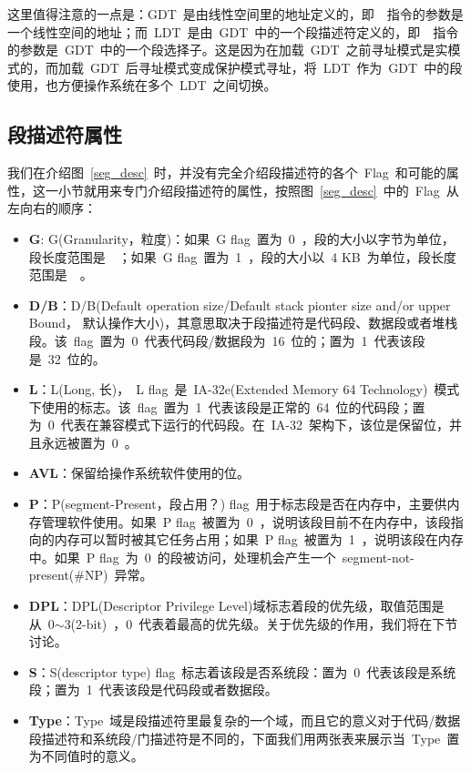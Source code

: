这里值得注意的一点是：GDT~是由线性空间里的地址定义的，即~~指令的参数是一个线性空间的地址；而~LDT~是由~GDT~中的一个段描述符定义的，即~~指令的参数是~GDT~中的一个段选择子。这是因为在加载~GDT~之前寻址模式是实模式的，而加载~GDT~后寻址模式变成保护模式寻址，将~LDT~作为~GDT~中的段使用，也方便操作系统在多个~LDT~之间切换。

\subsection{段描述符属性} \label{CHpm_desattr}

我们在介绍图~\ref{seg_desc}~时，并没有完全介绍段描述符的各个~Flag~和可能的属性，这一小节就用来专门介绍段描述符的属性，按照图~\ref{seg_desc}~中的~Flag~从左向右的顺序：

\begin{itemize}
\item{\textbf{G}}: G(Granularity，粒度)：如果~G flag~置为~0~，段的大小以字节为单位，段长度范围是~~；如果~G flag~置为~1~，段的大小以~4 KB~为单位，段长度范围是~~。
\item{\textbf{D/B}}：D/B(Default operation size/Default stack pionter size and/or upper Bound， 默认操作大小)，其意思取决于段描述符是代码段、数据段或者堆栈段。该~flag~置为~0~代表代码段/数据段为~16~位的；置为~1~代表该段是~32~位的。
\item{\textbf{L}}：L(Long, 长)，~L flag~是~IA-32e(Extended Memory 64 Technology)~模式下使用的标志。该~flag~置为~1~代表该段是正常的~64~位的代码段；置为~0~代表在兼容模式下运行的代码段。在~IA-32~架构下，该位是保留位，并且永远被置为~0~。
\item{\textbf{AVL}}：保留给操作系统软件使用的位。
\item{\textbf{P}}：P(segment-Present，段占用？) flag~用于标志段是否在内存中，主要供内存管理软件使用。如果~P flag~被置为~0~，说明该段目前不在内存中，该段指向的内存可以暂时被其它任务占用；如果~P flag~被置为~1~，说明该段在内存中。如果~P flag~为~0~的段被访问，处理机会产生一个~segment-not-present(\#NP)~异常。
\item{\textbf{DPL}}：DPL(Descriptor Privilege Level)域标志着段的优先级，取值范围是从~0$\sim$3(2-bit)~，0~代表着最高的优先级。关于优先级的作用，我们将在下节讨论。
\item{\textbf{S}}：S(descriptor type) flag~标志着该段是否系统段：置为~0~代表该段是系统段；置为~1~代表该段是代码段或者数据段。
\item{\textbf{Type}}：Type~域是段描述符里最复杂的一个域，而且它的意义对于代码/数据段描述符和系统段/门描述符是不同的，下面我们用两张表来展示当~Type~置为不同值时的意义。


\end{itemize}
